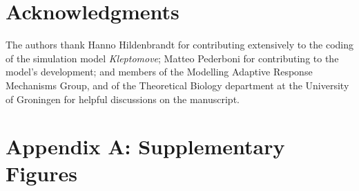 \documentclass[11pt]{article}
\begin{document}

\section*{Acknowledgments}

The authors thank Hanno Hildenbrandt for contributing extensively to the coding of the simulation model \textit{Kleptomove};
Matteo Pederboni for contributing to the model's development; 
and members of the Modelling Adaptive Response Mechanisms Group, and of the Theoretical Biology department at the University of Groningen for helpful discussions on the manuscript.



\newpage{}

\section*{Appendix A: Supplementary Figures}

%
%
%
%
%
\end{document}
